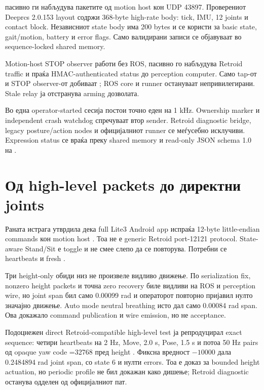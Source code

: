  пасивно ги набљудува пакетите од motion host кон UDP
43897. Проверениот Deeprcs 2.0.153 layout содржи 368-byte high-rate
 body: tick, IMU, 12 joints и contact block. Независниот
 state body има 200 bytes и се користи за basic state, gait/motion,
battery и error flags. Само валидирани записи се објавуваат во sequence-locked
shared memory.

Motion-host STOP observer работи без ROS, пасивно го набљудува Retroid traffic
и праќа HMAC-authenticated status до perception computer. Само tap-от и STOP
observer-от добиваат ; ROS core и runner остануваат
непривилегирани. Stale relay ја отстранува arming дозволата.

Во една operator-started сесија постои точно еден
 на 1 kHz. Ownership marker и
independent crash watchdog спречуваат втор sender. Retroid diagnostic bridge,
legacy posture/action nodes и официјалниот runner се меѓусебно исклучиви.
Expression status се враќа преку shared memory и read-only JSON schema 1.0 на
.

\section{Од high-level packets до директни joints}

Раната истрага утврдила дека full Lite3 Android app испраќа 12-byte
little-endian  commands кон motion host .
Тоа не е generic Retroid port-12121 protocol. State-aware Stand/Sit е toggle и
не смее слепо да се повторува. Потребни се heartbeats и fresh
.

Три height-only обиди низ
не произвеле видливо движење. По serialization fix, nonzero height packets и
точна zero recovery биле видливи на ROS и perception wire, но joint span бил
само 0.00099 rad и операторот повторно пријавил нулто значајно движење. Auto
mode neutral breathing исто дал само 0.00084 rad span. Ова докажало command
publication и wire emission, но не  acceptance.

Подоцнежен direct Retroid-compatible high-level test ја репродуцирал exact
sequence: четири heartbeats на 2 Hz, Move, 2.0 s, Pose, 1.5 s и потоа 50 Hz
pairs од opaque yaw code =32768 пред height
. Фиксна вредност $-10000$ дала 0.2484894 rad joint span, со
state 6 и нулти errors. Тоа е доказ за bounded height actuation, но periodic
profile не бил докажан како дишење; Retroid diagnostic останува одделен од
официјалниот пат.

